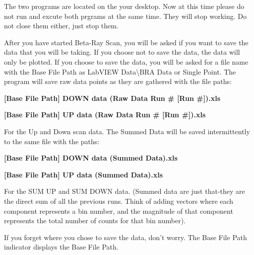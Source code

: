\documentclass{../lab}
\begin{document}
The two programs are located on the your desktop. Now at this time please do not run and excute both prgrams at the same time. They will stop working. Do not close them either, just stop them.

After you have started Beta-Ray Scan, you will be asked if you want to save the data that you will be taking. If you choose not to save the data, the data will only be plotted. If you choose to save the data, you will be asked for a file name with the Base File Path as LabVIEW Data\textbackslash BRA Data or Single Point. The program will save raw data points as they are gathered with the file paths:

\textbf{[Base File Path] DOWN data (Raw Data Run \# [Run \#]).xls}

\textbf{[Base File Path] UP data (Raw Data Run \# [Run \#]).xls}

For the Up and Down scan data. The Summed Data will be saved intermittently to the same file with the paths:

\textbf{[Base File Path] DOWN data (Summed Data).xls}

\textbf{[Base File Path] UP data (Summed Data).xls}

For the SUM UP and SUM DOWN data. (Summed data are just that-they are the direct sum of all the previous runs. Think of adding vectors where each component represents a bin number, and the magnitude of that component represents the total number of counts for that bin number).

If you forget where you chose to save the data, don't worry. The Base File Path indicator displays the Base File Path.
\end{document}
